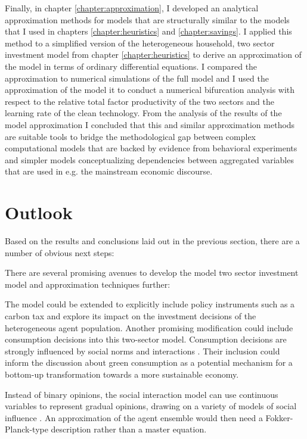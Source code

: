 Finally, in chapter \ref{chapter:approximation}, I developed an analytical approximation methods for models that are structurally similar to the models that I used in chapters \ref{chapter:heuristics} and \ref{chapter:savings}. I applied this method to a simplified version of the heterogeneous household, two sector investment model from chapter \ref{chapter:heuristics} to derive an approximation of the model in terms of ordinary differential equations. I compared the approximation to numerical simulations of the full model and I used the approximation of the model it to conduct a numerical bifurcation analysis with respect to the relative total factor productivity of the two sectors and the learning rate of the clean technology. 
From the analysis of the results of the model approximation I concluded that this and similar approximation methods are suitable tools to bridge the methodological gap between complex computational models that are backed by evidence from behavioral experiments and simpler models conceptualizing dependencies between aggregated variables that are used in e.g. the mainstream economic discourse.

\section{Outlook}
Based on the results and conclusions laid out in the previous section, there are a number of obvious next steps:

There are several promising avenues to develop the model two sector investment model and approximation techniques further: 

The model could be extended to explicitly include policy instruments such as a carbon tax and explore its impact on the investment decisions of the heterogeneous agent population. Another promising modification could include consumption decisions into this two-sector model. Consumption decisions are strongly influenced by social norms and interactions \citep{Peattie2010}. Their inclusion could inform the discussion about green consumption as a potential mechanism for a bottom-up transformation towards a more sustainable economy.


Instead of binary opinions, the social interaction model can use continuous variables to represent gradual opinions, drawing on a variety of models of social influence \citep[see ref.][pp. 988 f.]{Mueller-Hansen2017}. An approximation of the agent ensemble would then need a Fokker-Planck-type description rather than a master equation.

